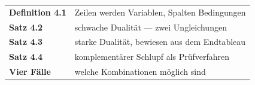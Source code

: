 \begin{merksatz}
\begin{center}
\renewcommand{\arraystretch}{1.5}
\begin{tabular}{@{}P{3.0cm}P{5.6cm}@{}}
\toprule
\textbf{Definition 4.1} & Zeilen werden Variablen, Spalten Bedingungen\\
\textbf{Satz 4.2} & schwache Dualität --- zwei Ungleichungen\\
\textbf{Satz 4.3} & starke Dualität, bewiesen aus dem Endtableau\\
\textbf{Satz 4.4} & komplementärer Schlupf als Prüfverfahren\\
\textbf{Vier Fälle} & welche Kombinationen möglich sind\\
\bottomrule
\end{tabular}
\end{center}

\begin{center}
\begin{minipage}{0.88\textwidth}
\end{minipage}
\end{center}
\end{merksatz}
